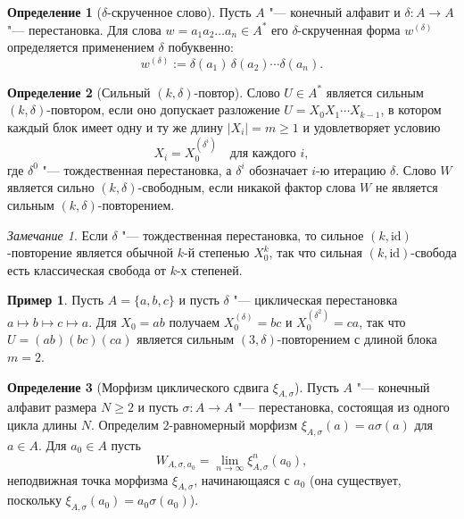 \documentclass[a4paper,14pt]{extreport}
\theoremstyle{plain}
\theoremstyle{definition}
\newtheorem{definition}{Определение}[section]
\newtheorem{example}{Пример}
\theoremstyle{remark}
\newtheorem{remark}{Замечание}
\begin{document}
\begin{definition}[$\delta$-скрученное слово]\label{def:twisted_word}
	Пусть $A$ "--- конечный алфавит и $\delta: A \to A$ "--- перестановка. Для слова $w = a_1 a_2 \dots a_n \in A^*$ его $\delta$-скрученная форма $w^{(\delta)}$ определяется применением $\delta$ побуквенно:
	\begin{equation}
		w^{(\delta)} := \delta(a_1)\, \delta(a_2) \cdots \delta(a_n).
	\end{equation}
\end{definition}

\begin{definition}[Сильный $(k, \delta)$-повтор]\label{def:strong_repetition}
	Слово $U \in A^*$ является сильным $(k, \delta)$-повтором, если оно допускает разложение $U = X_0 X_1 \cdots X_{k-1}$, в котором каждый блок имеет одну и ту же длину $|X_i| = m \ge 1$ и удовлетворяет условию
	\begin{equation}
		X_i = X_0^{(\delta^i)} \quad \text{для каждого } i,
	\end{equation}
	где $\delta^0$ "--- тождественная перестановка, а $\delta^i$ обозначает $i$-ю итерацию $\delta$. Слово $W$ является сильно $(k, \delta)$-свободным, если никакой фактор слова $W$ не является сильным $(k, \delta)$-повторением.
\end{definition}

\begin{remark}
	Если $\delta$ "--- тождественная перестановка, то сильное $(k,\mathrm{id})$-повторение является обычной $k$-й степенью $X_0^k$, так что сильная $(k,\mathrm{id})$-свобода есть классическая свобода от $k$-х степеней.
\end{remark}

\begin{example}
	Пусть $A = \{a, b, c\}$ и пусть $\delta$ "--- циклическая перестановка $a \mapsto b \mapsto c \mapsto a$. Для $X_0 = ab$ получаем
	$X_0^{(\delta)} = bc$ и $X_0^{(\delta^2)} = ca$, так что $U = (ab)(bc)(ca)$ является сильным $(3,\delta)$-повторением с длиной блока $m=2$.
\end{example}

\begin{definition}[Морфизм циклического сдвига $\xi_{A, \sigma}$]\label{def:psiAsigma}
	Пусть $A$ "--- конечный алфавит размера $N \ge 2$ и пусть $\sigma: A \to A$ "--- перестановка, состоящая из одного цикла длины $N$.
	Определим $2$-равномерный морфизм $\xi_{A, \sigma}(a) = a\sigma(a)$ для $a \in A$. Для $a_0\in A$ пусть
	\begin{equation}
		W_{A, \sigma, a_0} = \lim_{n \to \infty} \xi_{A, \sigma}^n(a_0),
	\end{equation}
	неподвижная точка морфизма $\xi_{A,\sigma}$, начинающаяся с $a_0$ (она существует, поскольку $\xi_{A,\sigma}(a_0)=a_0\sigma(a_0)$).
\end{definition}
\end{document}
